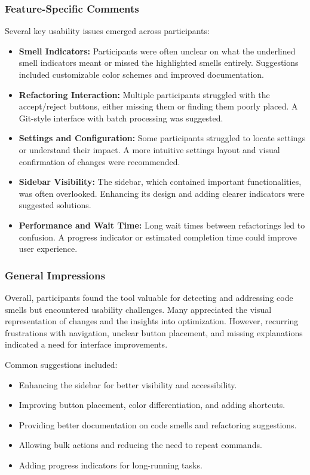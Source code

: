\documentclass{article}
\begin{document}
\subsubsection{Feature-Specific Comments}
Several key usability issues emerged across participants:
\begin{itemize}
\item \textbf{Smell Indicators:} Participants were often unclear on what the underlined smell indicators meant or missed the highlighted smells entirely. Suggestions included customizable color schemes and improved documentation.
\item \textbf{Refactoring Interaction:} Multiple participants struggled with the accept/reject buttons, either missing them or finding them poorly placed. A Git-style interface with batch processing was suggested.
\item \textbf{Settings and Configuration:} Some participants struggled to locate settings or understand their impact. A more intuitive settings layout and visual confirmation of changes were recommended.
\item \textbf{Sidebar Visibility:} The sidebar, which contained important functionalities, was often overlooked. Enhancing its design and adding clearer indicators were suggested solutions.
\item \textbf{Performance and Wait Time:} Long wait times between refactorings led to confusion. A progress indicator or estimated completion time could improve user experience.
\end{itemize}

\subsubsection{General Impressions}
Overall, participants found the tool valuable for detecting and addressing code smells but encountered usability challenges. Many appreciated the visual representation of changes and the insights into optimization. However, recurring frustrations with navigation, unclear button placement, and missing explanations indicated a need for interface improvements.

Common suggestions included:
\begin{itemize}
\item Enhancing the sidebar for better visibility and accessibility.
\item Improving button placement, color differentiation, and adding shortcuts.
\item Providing better documentation on code smells and refactoring suggestions.
\item Allowing bulk actions and reducing the need to repeat commands.
\item Adding progress indicators for long-running tasks.
\end{itemize}
\end{document}
